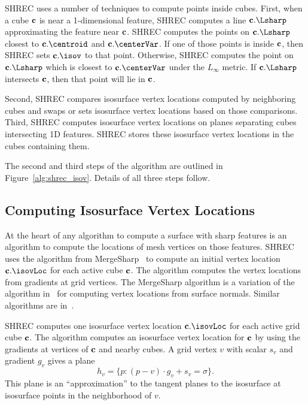 SHREC uses a number of techniques to compute points inside cubes.
First, when a cube $\mathbf{c}$ is near a 1-dimensional feature,
SHREC computes a line $\cb.\Lsharp$ approximating the feature near $\mathbf{c}$.
SHREC computes the points on $\cb.\Lsharp$ closest to $\cb.\centroid$
and $\cb.\centerVar$.
If one of those points is inside $\mathbf{c}$,
then SHREC sets $\cb.\isov$ to that point.
Otherwise, SHREC computes the point on $\cb.\Lsharp$ 
which is closest to $\cb.\centerVar$ under the $L_\infty$ metric.
If $\cb.\Lsharp$ intersects $\mathbf{c}$, then that point will lie in $\mathbf{c}$.

Second, SHREC compares isosurface vertex locations 
computed by neighboring cubes and swaps or sets isosurface vertex locations
based on those comparisons.
Third, SHREC computes isosurface vertex locations on planes
separating cubes intersecting 1D features.
SHREC stores these isosurface vertex locations in the cubes containing them.

The second and third steps of the algorithm are outlined 
in Figure~\ref{alg:shrec_isov}.
Details of all three steps follow.


\subsection{Computing Isosurface Vertex Locations}
\label{section:loc}

At the heart of any algorithm to compute a surface with sharp features 
is an algorithm to compute the locations of mesh vertices on those features.
SHREC uses the algorithm from MergeSharp~\cite{bw-cisec-13}
to compute an initial vertex location $\cb.\isovLoc$ 
for each active cube $\mathbf{c}$.
The algorithm computes the vertex locations 
from gradients at grid vertices.
The MergeSharp algorithm is a variation 
of the algorithm in~\cite{jlsw-dchd-02}
for computing vertex locations from surface normals.
Similar algorithms are in~\cite{kbsh-fssev-01,sw-dcss-02,zhk-dctps-04}.

SHREC computes one isosurface vertex location $\cb.\isovLoc$
for each active grid cube $\mathbf{c}$.
The algorithm computes an isosurface vertex location for $\mathbf{c}$
by using the gradients at vertices of $\mathbf{c}$ and nearby cubes.
A grid vertex $v$ with scalar $s_{v}$ and gradient $g_{v}$ gives a plane
\begin{equation}
\label{eqn:isoplane}
h_v = \{p : (p-v) \cdot g_{v} + s_{v}= \sigma \}.
\end{equation}
This plane is an ``approximation'' to the tangent planes to the isosurface
at isosurface points in the neighborhood of $v$.

